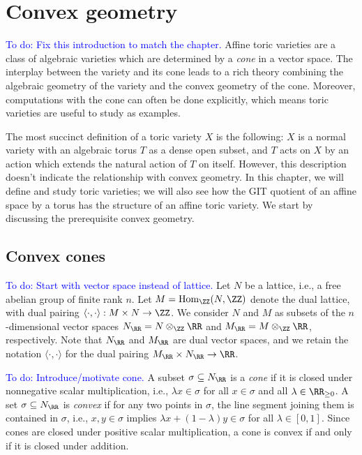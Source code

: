 \documentclass[12pt]{amsart}
\newcommand{\todo}[1]{\noindent  \textcolor{blue}{To do: #1}}
\theoremstyle{plain}
\begin{document}
\newpage
\section{Convex geometry}\label{sectionconvexgeometry}
\todo{Fix this introduction to match the chapter.}
Affine toric varieties are a class of algebraic varieties which are determined by a \emph{cone} in a vector space.
The interplay between the variety and its cone leads to a rich theory combining the algebraic geometry of the variety and the convex geometry of the cone.
Moreover, computations with the cone can often be done explicitly, which means toric varieties are useful to study as examples.

The most succinct definition of a toric variety $X$ is the following:
$X$ is a normal variety with an algebraic torus $T$ as a dense open subset, and $T$ acts on $X$ by an action which extends the natural action of $T$ on itself.
However, this description doesn't indicate the relationship with convex geometry.
In this chapter, we will define and study toric varieties; we will also see how the GIT quotient of an affine space by a torus has the structure of an affine toric variety.
We start by discussing the prerequisite convex geometry.

\subsection{Convex cones}
\todo{Start with vector space instead of lattice.}
Let $N$ be a lattice, i.e., a free abelian group of finite rank $n$.
Let $M = \mathrm{Hom}_\ZZ(N, \ZZ)$ denote the dual lattice, with dual pairing $\langle \cdot, \cdot \rangle : M \times N \to \ZZ$.
We consider $N$ and $M$ as subsets of the $n$-dimensional vector spaces
$N_\RR = N \otimes_\ZZ \RR$ and $M_\RR = M \otimes_\ZZ \RR$, respectively.
Note that $N_\RR$ and $M_\RR$ are dual vector spaces, and we retain the notation $\langle \cdot, \cdot \rangle$ for the dual pairing $M_\RR \times N_\RR \to \RR$.

\todo{Introduce/motivate cone.}
A subset $\sigma \subseteq N_\RR$ is a \emph{cone} if it is closed under nonnegative scalar multiplication, i.e., $\lambda x \in \sigma$ for all $x \in \sigma$ and all $\lambda \in \RR_{\ge 0}$.
A set $\sigma \subseteq N_\RR$ is \emph{convex} if for any two points in $\sigma$, the line segment joining them is contained in $\sigma$,
i.e., $x, y \in \sigma$ implies $\lambda x + (1 - \lambda) y \in \sigma$ for all $\lambda \in [0, 1]$.
Since cones are closed under positive scalar multiplication, a cone is convex if and only if it is closed under addition.
\end{document}
